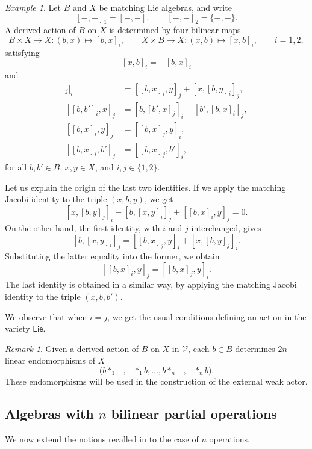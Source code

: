 \documentclass[reqno,a4paper]{amsart}
\theoremstyle{plain}
\theoremstyle{definition}
\theoremstyle{remark}
\newtheorem{remark}[subsection]{Remark}
\newtheorem{example}[subsection]{Example}
\numberwithin{equation}{section}
\newcommand{\V}{\mathcal{V}}
\newcommand{\Lie}{\ensuremath{\mathsf{Lie}}}
\begin{document}
\begin{example}\label{DerivedActionMatchingLie}
Let $B$ and $X$ be matching Lie algebras, and write
\[
[-,-]_1=[-,-],
\qquad
[-,-]_2=\{-,-\}.
\]
A derived action of $B$ on $X$ is determined by four bilinear maps
\[
B\times X\to X\colon (b,x)\mapsto[b,x]_i,
\qquad
X\times B\to X\colon (x,b)\mapsto[x,b]_i,
\qquad i=1,2,
\]
satisfying
\[
[x,b]_i=-[b,x]_i
\]
and
\begin{align*}
[b,[x,y]_j]_i
&=[[b,x]_i,y]_j+[x,[b,y]_i]_j,\\
[[b,b']_i,x]_j
&=[b,[b',x]_j]_i-[b',[b,x]_i]_j,\\
[[b,x]_i,y]_j
&=[[b,x]_j,y]_i,\\
[[b,x]_i,b']_j
&=[[b,x]_j,b']_i,
\end{align*}
for all $b,b'\in B$, $x,y\in X$, and $i,j\in\{1,2\}$.

Let us explain the origin of the last two identities. If we apply the matching Jacobi identity to the triple $(x,b,y)$, we get
\[
[x,[b,y]_j]_i-[b,[x,y]_i]_j+[[b,x]_i,y]_j=0.
\]
On the other hand, the first identity, with $i$ and $j$ interchanged, gives
\[
[b,[x,y]_i]_j
=
[[b,x]_j,y]_i+[x,[b,y]_j]_i.
\]
Substituting the latter equality into the former, we obtain
\[
[[b,x]_i,y]_j
=
[[b,x]_j,y]_i.
\]
The last identity is obtained in a similar way, by applying the matching Jacobi identity to the triple $(x,b,b')$. 

We observe that when $i=j$, we get the usual conditions defining an action in the variety $\Lie$.
\end{example}

\begin{remark}
Given a derived action of $B$ on $X$ in $\V$, each $b\in B$ determines $2n$ linear endomorphisms of $X$
\[
\bigl(
b\ast_1-,-\ast_1 b,\ldots,
b\ast_n-,-\ast_n b
\bigr).
\]
These endomorphisms will be used in the construction of the external weak actor.
\end{remark}

\subsection{Algebras with $n$ bilinear partial operations}\label{SecPartialAlgebrasN}

We now extend the notions recalled in  to the case of $n$ operations.
\end{document}
